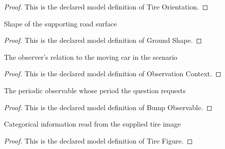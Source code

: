\begin{proof}
  This is the declared model definition of Tire Orientation.
\end{proof}
\begin{definition}
  \label{def:physics:phyx-mini-0225:phyxminiproblems-problemphyxmini0225-groundshape}
  Shape of the supporting road surface
\end{definition}
\begin{proof}
  This is the declared model definition of Ground Shape.
\end{proof}
\begin{definition}
  \label{def:physics:phyx-mini-0225:phyxminiproblems-problemphyxmini0225-observationcontext}
  The observer's relation to the moving car in the scenario
\end{definition}
\begin{proof}
  This is the declared model definition of Observation Context.
\end{proof}
\begin{definition}
  \label{def:physics:phyx-mini-0225:phyxminiproblems-problemphyxmini0225-bumpobservable}
  The periodic observable whose period the question requests
\end{definition}
\begin{proof}
  This is the declared model definition of Bump Observable.
\end{proof}
\begin{definition}
  \label{def:physics:phyx-mini-0225:phyxminiproblems-problemphyxmini0225-tirefigure}
  Categorical information read from the supplied tire image
\end{definition}
\begin{proof}
  This is the declared model definition of Tire Figure.
\end{proof}
